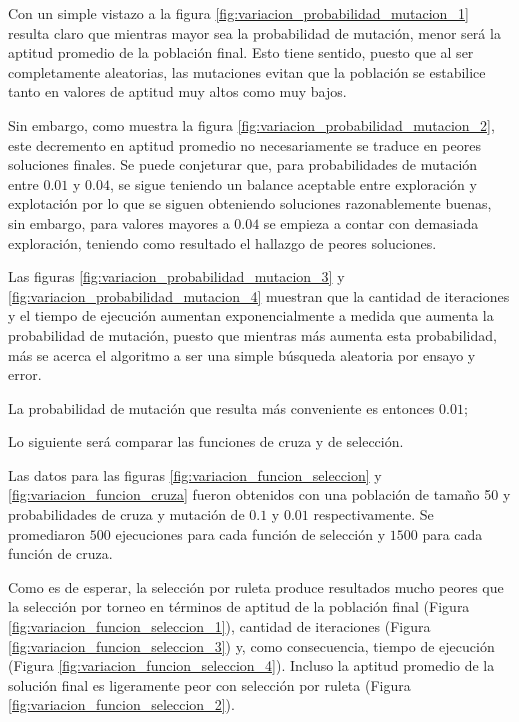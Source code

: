 \documentclass[12pt]{article} %
\begin{document}
Con un simple vistazo a la figura \ref{fig:variacion_probabilidad_mutacion_1}
resulta claro que mientras mayor sea la probabilidad de mutación, menor será la aptitud
promedio de la población final. Esto tiene sentido, puesto que al ser completamente
aleatorias, las mutaciones evitan que la población se estabilice tanto en valores
de aptitud muy altos como muy bajos.

Sin embargo, como muestra la figura \ref{fig:variacion_probabilidad_mutacion_2},
este decremento en aptitud promedio no necesariamente se traduce en peores soluciones
finales. Se puede conjeturar que, para probabilidades de mutación entre $0.01$ y $0.04$,
se sigue teniendo un balance aceptable entre exploración y explotación por lo que
se siguen obteniendo soluciones razonablemente buenas, sin embargo, para valores
mayores a $0.04$ se empieza a contar con demasiada exploración, teniendo como
resultado el hallazgo de peores soluciones.

Las figuras \ref{fig:variacion_probabilidad_mutacion_3} y
\ref{fig:variacion_probabilidad_mutacion_4} muestran que la cantidad de iteraciones
y el tiempo de ejecución aumentan exponencialmente a medida que aumenta la
probabilidad de mutación, puesto que mientras más aumenta esta probabilidad, más
se acerca el algoritmo a ser una simple búsqueda aleatoria por ensayo y error.

La probabilidad de mutación que resulta más conveniente es entonces $0.01$;

Lo siguiente será comparar las funciones de cruza y de selección.



Las datos para las figuras \ref{fig:variacion_funcion_seleccion} y
\ref{fig:variacion_funcion_cruza} fueron obtenidos con una población de tamaño 50
y probabilidades de cruza y mutación de $0.1$ y $0.01$ respectivamente. Se
promediaron $500$ ejecuciones para cada función de selección y $1500$ para cada
función de cruza.

Como es de esperar, la selección por ruleta produce resultados mucho peores que
la selección por torneo en términos de aptitud de la población final (Figura
\ref{fig:variacion_funcion_seleccion_1}), cantidad de iteraciones (Figura
\ref{fig:variacion_funcion_seleccion_3}) y, como consecuencia, tiempo de ejecución
(Figura \ref{fig:variacion_funcion_seleccion_4}). Incluso la aptitud promedio
de la solución final es ligeramente peor con selección por ruleta (Figura
\ref{fig:variacion_funcion_seleccion_2}).
\end{document}
